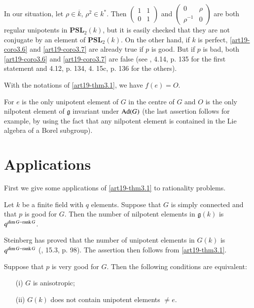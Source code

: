 In our situation, let $\rho\in \overline{k}$, $\rho^{2}\in k^{*}$. Then $\left(\begin{matrix} 1 & 1\\ 0 & 1\end{matrix}\right)$ and $\left(\begin{matrix} 0 & \rho\\ \rho^{-1} & 0\end{matrix}\right)$ are both regular unipotents in $\mathbf{PSL}_{2}(k)$, but it is easily checked that they are not conjugate by an element of $\mathbf{PSL}_{2}(k)$. On the other hand, if $k$ is perfect, \ref{art19-coro3.6} and \ref{art19-coro3.7} are already true if $p$ is good. But if $p$ is bad, both \ref{art19-coro3.6} and \ref{art19-coro3.7} are false (see \cite{art19-key14}, 4.14, p. 135 for the first statement and 4.12, p. 134, 4. 15c, p. 136 for the others).

\begin{corollary}\label{art19-coro3.9}
With the notations of \ref{art19-thm3.1}, we have $f(e)=O$.
\end{corollary}

For $e$ is the only unipotent element of $G$ in the centre of $G$ and $O$ is the only nilpotent element of $\mathfrak{g}$ invariant under $\operatorname{\mathrm{Ad}}(G)$ (the last assertion follows for example, by using the fact that any nilpotent element is contained in the Lie algebra of a Borel subgroup).

\section{Applications}\label{art19-sec4}

First we give some applications of \ref{art19-thm3.1} to rationality problems.

\begin{proposition}\label{art19-prop4.1}
Let $k$ be a finite field with $q$ elements. Suppose that $G$ is simply connected and that $p$ is good for $G$. Then the number of nilpotent elements in $\mathfrak{g}(k)$ is $q^{\dim G-\operatorname{\mathrm{rank}} G}$.
\end{proposition}

Steinberg has proved that the number of unipotent elements in $G(k)$ is $q^{\dim G-\operatorname{\mathrm{rank}} G}$ (\cite{art19-key16}, 15.3, p. 98). The assertion then follows from \ref{art19-thm3.1}.

\begin{proposition}\label{art19-prop4.2}
Suppose that $p$ is very good for $G$. Then the following conditions are equivalent:
\begin{itemize}
\item[\rm(i)] $G$ is anisotropic;

\item[\rm(ii)] $G(k)$ does not contain unipotent elements $\neq e$.
\end{itemize}
\end{proposition}


